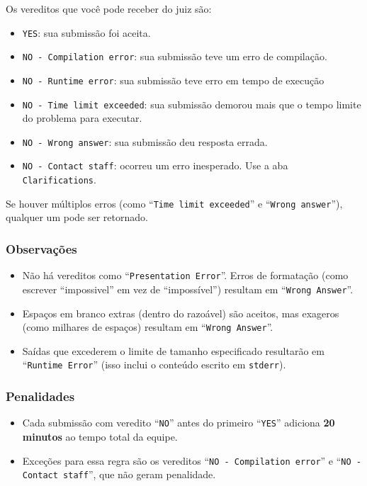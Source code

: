 \documentclass{article}
\begin{document}
\begin{titlepage}
\noindent Os vereditos que você pode receber do juiz são:

\begin{itemize}
    \item \texttt{YES}: sua submissão foi aceita.
    \item \texttt{NO - Compilation error}: sua submissão teve um erro de compilação.
    \item \texttt{NO - Runtime error}: sua submissão teve erro em tempo de execução
    \item \texttt{NO - Time limit exceeded}: sua submissão demorou mais que o tempo limite do problema para executar.
    \item \texttt{NO - Wrong answer}: sua submissão deu resposta errada.
    \item \texttt{NO - Contact staff}: ocorreu um erro inesperado. Use a aba \texttt{Clarifications}.
\end{itemize}

\noindent Se houver múltiplos erros (como ``\texttt{Time limit exceeded}'' e ``\texttt{Wrong answer}''), qualquer um pode ser retornado.

\subsubsection{Observações}

\begin{itemize}
    \item Não há vereditos como ``\texttt{Presentation Error}''. Erros de formatação (como escrever ``impossivel'' em vez de ``impossível'') resultam em ``\texttt{Wrong Answer}''.
    \item Espaços em branco extras (dentro do razoável) são aceitos, mas exageros (como milhares de espaços) resultam em ``\texttt{Wrong Answer}''.
    \item Saídas que excederem o limite de tamanho especificado resultarão em ``\texttt{Runtime Error}'' (isso inclui o conteúdo escrito em \texttt{stderr}).
\end{itemize}

\subsubsection{Penalidades}

\begin{itemize}
    \item Cada submissão com veredito ``\texttt{NO}'' antes do primeiro ``\texttt{YES}'' adiciona \textbf{20 minutos} ao tempo total da equipe.
    \item Exceções para essa regra são os vereditos ``\texttt{NO - Compilation error}'' e ``\texttt{NO - Contact staff}'', que não geram penalidade.
\end{itemize}


\end{titlepage}
\end{document}
